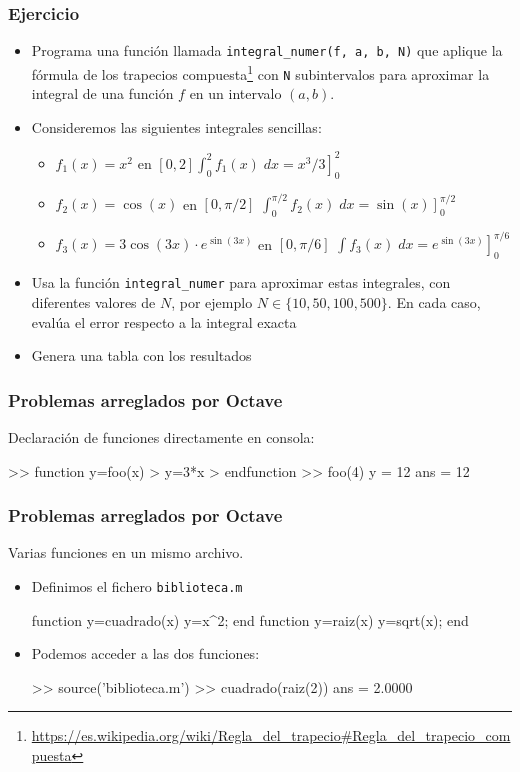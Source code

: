\begin{frame}[fragile]
\frametitle{Ejercicio}
\begin{itemize}
    \item Programa una función llamada \texttt{integral\_numer(f, a, b, N)} que aplique la fórmula de los trapecios compuesta\footnote{\url{https://es.wikipedia.org/wiki/Regla_del_trapecio\#Regla_del_trapecio_compuesta}} con \texttt{N} subintervalos para aproximar la integral de una función $f$ en un intervalo $(a,b)$.
  \item Consideremos las siguientes integrales sencillas:
    \begin{itemize} \scriptsize \setlength{\itemsep}{2pt}
      \item $f_1(x)=x^2$ en $[0, 2]$\dotfill $\int_0^2 f_1(x) \; dx = \left. x^3/3 \right]_0^2$
      \item $f_2(x)=\cos(x)$ en $[0,\pi/2]$ \dotfill 
        $\int_0^{\pi/2} f_2(x) \; dx = \left. \sin(x) \right]_0^{\pi/2}$
      \item $f_3(x)=3\cos(3x)\cdot e^{\sin(3x)}$ en $[0,\pi/6]$
        \dotfill $\int f_3(x) \; dx =  \left. e^{\sin(3x)} \right]_0^{\pi/6}$
    \end{itemize}
  \item Usa la función \texttt{integral\_numer} para aproximar estas integrales, con diferentes valores de $N$, por ejemplo $N\in\{10,50,100,500\}$. En cada caso, evalúa el error respecto a la integral exacta 
  \item Genera una tabla con los resultados
\end{itemize}
\end{frame}


\begin{frame}[containsverbatim]
\frametitle{Problemas arreglados por Octave}

Declaración de funciones directamente en consola:
\begin{Octave}
>> function y=foo(x) 
> y=3*x 
> endfunction
>> foo(4) 
y =  12 
ans =  12
\end{Octave}
\end{frame}

\begin{frame}[containsverbatim]
 \frametitle{Problemas arreglados por Octave}
 Varias funciones en un mismo archivo.
 \begin{itemize}
 \item 
 Definimos el fichero \texttt{biblioteca.m}
 \begin{Octave}
   function y=cuadrado(x)
     y=x^2;
   end
   function y=raiz(x)
     y=sqrt(x);
   end
 \end{Octave}
 \item 
 Podemos acceder a las dos funciones:
 \begin{Octave}
   >> source('biblioteca.m')
   >> cuadrado(raiz(2))
   ans =  2.0000
 \end{Octave}
\end{itemize}
\end{frame}



